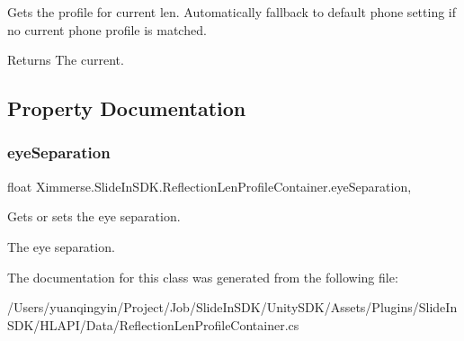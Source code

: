 Gets the profile for current len. Automatically fallback to default phone setting if no current phone profile is matched. 

\begin{DoxyReturn}{Returns}
The current.
\end{DoxyReturn}


\subsection{Property Documentation}
\mbox{\label{class_ximmerse_1_1_slide_in_s_d_k_1_1_reflection_len_profile_container_a47057a731f43bf00b03f6ebac0a9b2de}} 
\subsubsection{\texorpdfstring{eye\+Separation}{eyeSeparation}}
{\footnotesize\ttfamily float Ximmerse.\+Slide\+In\+S\+D\+K.\+Reflection\+Len\+Profile\+Container.\+eye\+Separation\hspace{0.3cm}{\ttfamily [get]}, {\ttfamily [set]}}



Gets or sets the eye separation. 

The eye separation.

The documentation for this class was generated from the following file\+:\begin{DoxyCompactItemize}
\item 
/\+Users/yuanqingyin/\+Project/\+Job/\+Slide\+In\+S\+D\+K/\+Unity\+S\+D\+K/\+Assets/\+Plugins/\+Slide\+In\+S\+D\+K/\+H\+L\+A\+P\+I/\+Data/Reflection\+Len\+Profile\+Container.\+cs\end{DoxyCompactItemize}
